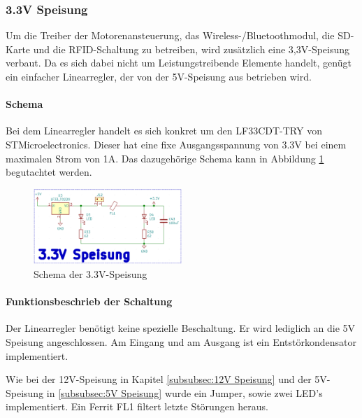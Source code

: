 \subsubsection{3.3V Speisung}
\label{subsubsec:3.3V Speisung}

Um die Treiber der Motorenansteuerung, das Wireless-/Bluetoothmodul, die SD-Karte und die RFID-Schaltung zu betreiben, wird zusätzlich eine 3,3V-Speisung verbaut. Da es sich dabei nicht um  Leistungstreibende Elemente handelt, genügt ein einfacher Linearregler, der von der 5V-Speisung aus betrieben wird. 

\paragraph{Schema}\mbox{}

Bei dem Linearregler handelt es sich konkret um den LF33CDT-TRY von STMicroelectronics. Dieser hat eine fixe Ausgangsspannung von 3.3V bei einem maximalen Strom von 1A. Das dazugehörige Schema kann in Abbildung \ref{fig:Schema_Speisung_3.3V} begutachtet werden.

\begin{figure}[h!]
	\centering
	\includegraphics[width=0.5\textwidth]{graphics/Schema_Speisung_3,3V.png}
	\caption{Schema der 3.3V-Speisung}
	\label{fig:Schema_Speisung_3.3V}
\end{figure} 


\paragraph{Funktionsbeschrieb der Schaltung}\mbox{}

Der Linearregler benötigt keine spezielle Beschaltung. Er wird lediglich an die 5V Speisung angeschlossen. Am Eingang und am Ausgang ist ein Entstörkondensator implementiert. 

Wie bei der 12V-Speisung in Kapitel \ref{subsubsec:12V Speisung} und der 5V-Speisung in \ref{subsubsec:5V Speisung} wurde ein Jumper, sowie zwei LED's implementiert. Ein Ferrit FL1 filtert letzte Störungen heraus.